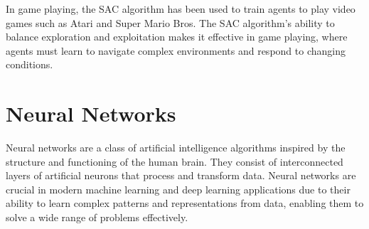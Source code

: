 In game playing, the SAC algorithm has been used to train agents to play video games such as Atari and Super Mario Bros.  The SAC algorithm's ability to balance exploration and exploitation makes it effective in game playing, where agents must learn to navigate complex environments and respond to changing conditions.

% 

% 

% 
 
\section{Neural Networks}


Neural networks are a class of artificial intelligence algorithms inspired by the structure and functioning of the human brain. They consist of interconnected layers of artificial neurons that process and transform data. Neural networks are crucial in modern machine learning and deep learning applications due to their ability to learn complex patterns and representations from data, enabling them to solve a wide range of problems effectively.

